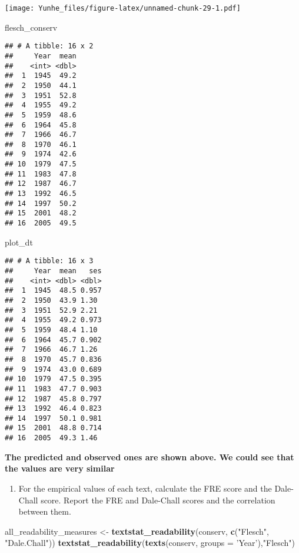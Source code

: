 \documentclass[]{article}
\newenvironment{Shaded}{\begin{snugshade}}{\end{snugshade}}
\newcommand{\KeywordTok}[1]{\textcolor[rgb]{0.13,0.29,0.53}{\textbf{#1}}}
\newcommand{\DataTypeTok}[1]{\textcolor[rgb]{0.13,0.29,0.53}{#1}}
\newcommand{\StringTok}[1]{\textcolor[rgb]{0.31,0.60,0.02}{#1}}
\newcommand{\NormalTok}[1]{#1}
\providecommand{\tightlist}{%
  \setlength{\itemsep}{0pt}\setlength{\parskip}{0pt}}
\begin{document}
\texttt{[image: Yunhe\_files/figure-latex/unnamed-chunk-29-1.pdf]}

\begin{Shaded}
\begin{Highlighting}[]
\NormalTok{flesch_conserv}
\end{Highlighting}
\end{Shaded}

\begin{verbatim}
## # A tibble: 16 x 2
##     Year  mean
##    <int> <dbl>
##  1  1945  49.2
##  2  1950  44.1
##  3  1951  52.8
##  4  1955  49.2
##  5  1959  48.6
##  6  1964  45.8
##  7  1966  46.7
##  8  1970  46.1
##  9  1974  42.6
## 10  1979  47.5
## 11  1983  47.8
## 12  1987  46.7
## 13  1992  46.5
## 14  1997  50.2
## 15  2001  48.2
## 16  2005  49.5
\end{verbatim}

\begin{Shaded}
\begin{Highlighting}[]
\NormalTok{plot_dt}
\end{Highlighting}
\end{Shaded}

\begin{verbatim}
## # A tibble: 16 x 3
##     Year  mean   ses
##    <int> <dbl> <dbl>
##  1  1945  48.5 0.957
##  2  1950  43.9 1.30 
##  3  1951  52.9 2.21 
##  4  1955  49.2 0.973
##  5  1959  48.4 1.10 
##  6  1964  45.7 0.902
##  7  1966  46.7 1.26 
##  8  1970  45.7 0.836
##  9  1974  43.0 0.689
## 10  1979  47.5 0.395
## 11  1983  47.7 0.903
## 12  1987  45.8 0.797
## 13  1992  46.4 0.823
## 14  1997  50.1 0.981
## 15  2001  48.8 0.714
## 16  2005  49.3 1.46
\end{verbatim}

\textbf{The predicted and observed ones are shown above. We could see
that the values are very similar}

\begin{enumerate}
\def\labelenumi{(\alph{enumi})}
\setcounter{enumi}{2}
\tightlist
\item
  For the empirical values of each text, calculate the FRE score and the
  Dale-Chall score. Report the FRE and Dale-Chall scores and the
  correlation between them.
\end{enumerate}

\begin{Shaded}
\begin{Highlighting}[]
\NormalTok{all_readability_measures <-}\StringTok{ }\KeywordTok{textstat_readability}\NormalTok{(conserv, }\KeywordTok{c}\NormalTok{(}\StringTok{"Flesch"}\NormalTok{, }\StringTok{"Dale.Chall"}\NormalTok{))}
\KeywordTok{textstat_readability}\NormalTok{(}\KeywordTok{texts}\NormalTok{(conserv, }\DataTypeTok{groups =} \StringTok{'Year'}\NormalTok{),}\StringTok{"Flesch"}\NormalTok{)}
\end{Highlighting}
\end{Shaded}
\end{document}
